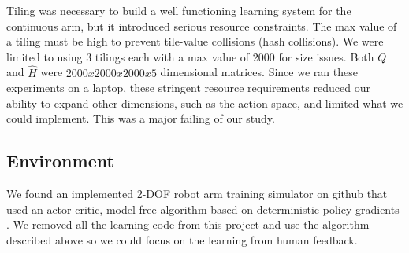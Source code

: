 \documentclass{article}
\begin{document}
Tiling was necessary to build a well functioning learning system for the continuous arm, but it introduced serious resource constraints. The max value of a tiling must be high to prevent tile-value collisions (hash collisions). We were limited to using 3 tilings each with a max value of 2000 for size issues. Both $Q$ and $\hat{H}$ were $2000x2000x2000x5$ dimensional matrices. Since we ran these experiments on a laptop, these stringent resource requirements reduced our ability to expand other dimensions, such as the action space, and limited what we could implement. This was a major failing of our study.

\subsection{Environment}

We found an implemented 2-DOF robot arm training simulator on github \cite{zhou_train-robot-arm--scratch_2019} that used an actor-critic, model-free algorithm based on deterministic policy gradients \cite{lillicrap_continuous_2015}. We removed all the learning code from this project and use the algorithm described above so we could focus on the learning from human feedback.
\end{document}
